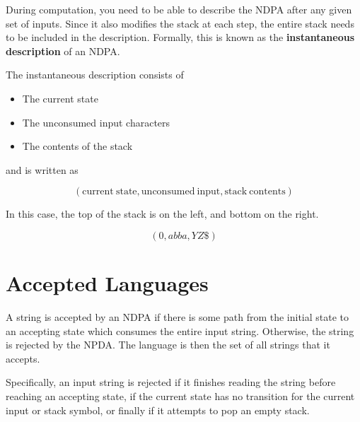 During computation, you need to be able to describe the NDPA after any given set of inputs. Since it also modifies the
 stack at each step, the entire stack needs to be included in the description. Formally, this is known as the
 \textbf{instantaneous description} of an NDPA.

\begin{definition*}{}{}
  The instantaneous description consists of
  \begin{itemize}
    \item The current state
    \item The unconsumed input characters
    \item The contents of the stack
  \end{itemize}
  and is written as

  \begin{equation*}
    (\mathrm{current\ state}, \mathrm{unconsumed\ input}, \mathrm{stack\ contents})
  \end{equation*}

  In this case, the top of the stack is on the left, and bottom on the right.
\end{definition*}

\begin{example*}{}{}
  \begin{equation*}
    (0, abba, YZ\$)
  \end{equation*}
\end{example*}

\section*{Accepted Languages}

A string is accepted by an NDPA if there is some path from the initial state to an accepting state which consumes the
 entire input string. Otherwise, the string is rejected by the NPDA. The language is then the set of all strings that
 it accepts.

Specifically, an input string is rejected if it finishes reading the string before reaching an accepting state, if the
 current state has no transition for the current input or stack symbol, or finally if it attempts to pop an empty stack.


